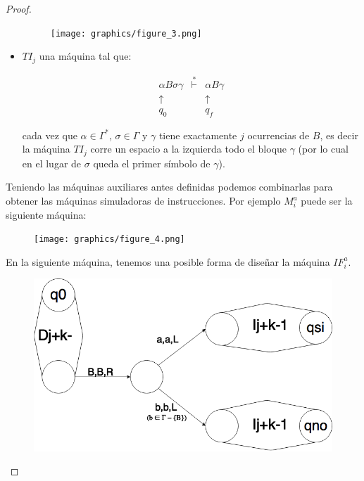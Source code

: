 \begin{proof}
\begin{itemize}
        \begin{figure}[h]
          \centering
          \texttt{[image: graphics/figure\_3.png]}
        \end{figure}

      \pagebreak
      \item $TI_{j}$ una máquina tal que:

    		\[
          \begin{array}{ccc}
            \alpha B \sigma \gamma &\overset{\ast}{\vdash}& \alpha B \gamma \\
            \uparrow \ && \uparrow \\
            q_{0} \ \ && q_{f}
          \end{array}
    	  \]

        \PN cada vez que $\alpha \in \Gamma ^{\ast }$, $\sigma \in \Gamma $ y $\gamma $ tiene exactamente $j$
        ocurrencias de $B$, es decir la máquina $TI_{j}$ corre un espacio a la izquierda todo el bloque $\gamma $ (por
        lo cual en el lugar de $\sigma $ queda el primer símbolo de $\gamma $).
    \end{itemize}

    \vspace{5mm}
    \PN Teniendo las máquinas auxiliares antes definidas podemos combinarlas para obtener las máquinas simuladoras de
    instrucciones. Por ejemplo $M_{i}^{a}$ puede ser la siguiente máquina:

    \begin{figure}[h]
      \centering
      \texttt{[image: graphics/figure\_4.png]}
    \end{figure}

    \PN En la siguiente máquina, tenemos una posible forma de diseñar la máquina $IF_{i}^{a}$.

    \begin{figure}[h]
      \centering
      \includegraphics[scale=0.33]{graphics/figure_2.png}
    \end{figure}


\end{proof}
